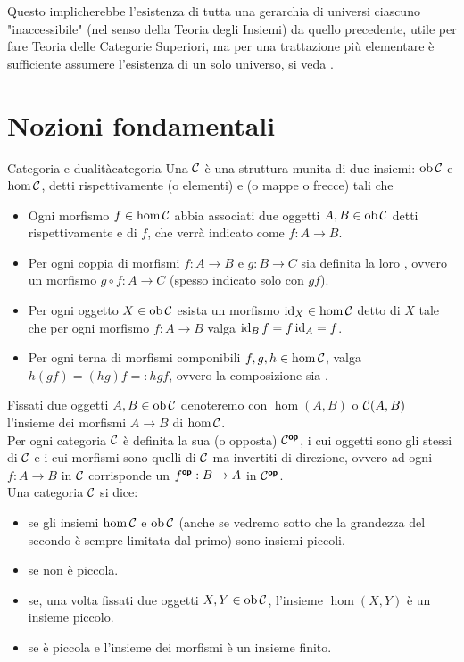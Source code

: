 \documentclass{article}
\renewcommand\C{\mc{C}}
\begin{document}
Questo implicherebbe l'esistenza di tutta una gerarchia di universi ciascuno "inaccessibile" (nel senso della Teoria degli Insiemi) da quello precedente, utile per fare Teoria delle Categorie Superiori, ma per una trattazione più elementare è sufficiente assumere l'esistenza di un solo universo, si veda \cite{MacLane1969}.

\section{Nozioni fondamentali}

\begin{definition}{Categoria e dualità}{categoria}
    Una  $\C$ è una struttura munita di due insiemi: $\ob\C$ e $\hom\C$, detti rispettivamente  (o elementi) e  (o mappe o frecce) tali che \begin{itemize}
        \item Ogni morfismo $f \in \hom\C$ abbia associati due oggetti $A,B \in \ob\C$ detti rispettivamente  e  di $f$, che verrà indicato come $f : A\to B$.
        \item Per ogni coppia di morfismi $f:A\to B$ e $g : B\to C$ sia definita la loro , ovvero un morfismo $g\circ f : A \to C$ (spesso indicato solo con $gf$).
        \item Per ogni oggetto $X \in \ob\C$ esista un morfismo $\id_X \in \hom\C$ detto  di $X$ tale che per ogni morfismo $f:A\to B$ valga $\operatorname{id}_B f = f \operatorname{id}_A = f$.
        \item Per ogni terna di morfismi componibili $f,g,h \in \hom\C$, valga $h(gf) = (hg)f =: hgf$, ovvero la composizione sia .
    \end{itemize}
    Fissati due oggetti $A,B \in \ob\C$ denoteremo con $\hom(A,B)$ o $\C(A,B)$ l'insieme dei morfismi $A\to B$ di $\hom\C$.\\
    Per ogni categoria $\C$ è definita la sua  (o opposta) $\C^\op$, i cui oggetti sono gli stessi di $\C$ e i cui morfismi sono quelli di $\C$ ma invertiti di direzione, ovvero ad ogni $f:A\to B$ in $\C$ corrisponde un $f^{\text{\sffamily\textbf{op}}} : B\to A$ in $\C^\op$.\\
    Una categoria $\C$ si dice:\begin{itemize}
        \item {} se gli insiemi $\hom\C$ e $\ob\C$ (anche se vedremo sotto che la grandezza del secondo è sempre limitata dal primo) sono insiemi piccoli.
        \item {} se non è piccola.
        \item {} se, una volta fissati due oggetti $X,Y \in \ob\C$, l'insieme $\hom(X,Y)$ è un insieme piccolo.
        \item {} se è piccola e l'insieme dei morfismi è un insieme finito.
    \end{itemize}
\end{definition}
\end{document}
